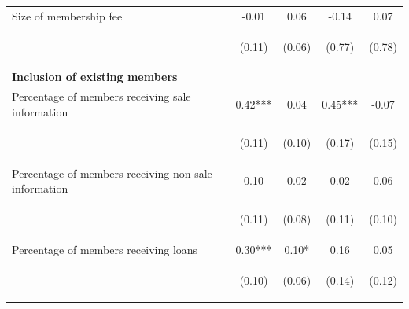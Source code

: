 \documentclass[11pt]{article}
\begin{document}
\begin{table}[H]
{\begin{tabularx}{1.3\linewidth}{lcccc}
\noalign{\smallskip}Size of membership fee & -0.01 & 0.06 & -0.14 & 0.07\\
  & \begin{footnotesize}(0.11)\end{footnotesize} & \begin{footnotesize}(0.06)\end{footnotesize} & \begin{footnotesize}(0.77)\end{footnotesize} & \begin{footnotesize}(0.78)\end{footnotesize}\\
  
 \textbf{Inclusion of existing members} & & & & \\
\noalign{\smallskip}Percentage of members receiving sale information & 0.42*** & 0.04 & 0.45*** & -0.07\\
 & \begin{footnotesize}(0.11)\end{footnotesize} & \begin{footnotesize}(0.10)\end{footnotesize} & \begin{footnotesize}(0.17)\end{footnotesize} & \begin{footnotesize}(0.15)\end{footnotesize}\\
\noalign{\smallskip}Percentage of members receiving non-sale information & 0.10 & 0.02 & 0.02 & 0.06\\
 & \begin{footnotesize}(0.11)\end{footnotesize} & \begin{footnotesize}(0.08)\end{footnotesize} & \begin{footnotesize}(0.11)\end{footnotesize} & \begin{footnotesize}(0.10)\end{footnotesize}\\
\noalign{\smallskip}Percentage of members receiving loans & 0.30*** & 0.10* & 0.16 & 0.05\\
 & \begin{footnotesize}(0.10)\end{footnotesize} & \begin{footnotesize}(0.06)\end{footnotesize} & \begin{footnotesize}(0.14)\end{footnotesize} & \begin{footnotesize}(0.12)\end{footnotesize}\\

\end{tabularx}}
\end{table}
\end{document}
